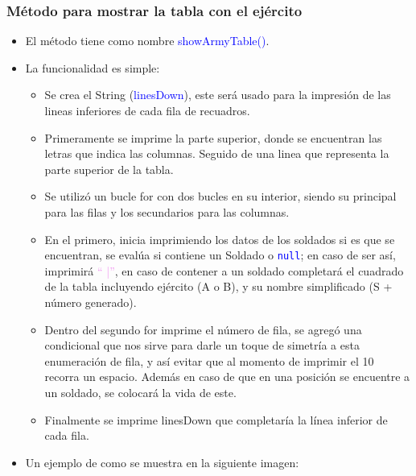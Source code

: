 \documentclass{article}
\begin{document}
        
        \subsubsection{Método para mostrar la tabla con el ejército}

        \begin{itemize}
            \item El método tiene como nombre \textcolor{blue}{showArmyTable()}.
            \item La funcionalidad es simple:
            \begin{itemize}
                \item Se crea el String (\textcolor{blue}{linesDown}), este será usado para la impresión de las lineas inferiores de cada fila de recuadros.
                \item Primeramente se imprime la parte superior, donde se encuentran las letras que indica las columnas. Seguido de una linea que representa la parte superior de la tabla.
                \item Se utilizó un bucle for con dos bucles en su interior, siendo su principal para las filas y los secundarios para las columnas.
                \item En el primero, inicia imprimiendo los datos de los soldados si es que se encuentran, se evalúa si contiene un Soldado o \textcolor{blue}{\texttt{null}}; en caso de ser así, imprimirá \textcolor{violet}{`` |''}, en caso de contener a un soldado completará el cuadrado de la tabla incluyendo ejército (A o B), y su nombre simplificado (S + número generado). 
                \item Dentro del segundo for imprime el número de fila, se agregó una condicional que nos sirve para darle un toque de simetría a esta enumeración de fila, y así evitar que al momento de imprimir el 10 recorra un espacio. Además en caso de que en una posición se encuentre a un soldado, se colocará la vida de este.
                \item Finalmente se imprime linesDown que completaría la línea inferior de cada fila.
            \end{itemize}
        \end{itemize}
\newpage
        
        
        \begin{itemize}
            \begin{itemize}
                \item Un ejemplo de como se muestra en la siguiente imagen:
            \end{itemize}
        \end{itemize}
\end{document}

